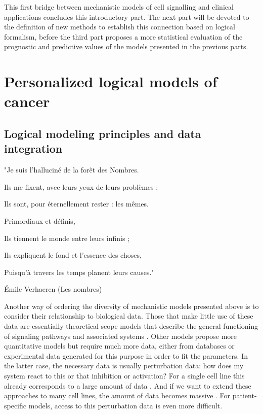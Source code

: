 \documentclass[a4paper,12pt,twoside,onecolumn,openright,final,oldfontcommands]{memoir}
\newcommand{\initial}[1]{
	\lettrine[lines=3,lhang=0.33,nindent=0em]{
		\color{gray}
     		{\textsc{#1}}}{}}
\begin{document}
This first bridge between mechanistic models of cell signalling and
clinical applications concludes this introductory part. The next part
will be devoted to the definition of new methods to establish this
connection based on logical formalism, before the third part proposes a
more statistical evaluation of the prognostic and predictive values of
the models presented in the previous parts.

\part{Personalized logical models of
cancer}\label{part-personalized-logical-models-of-cancer}

\chapter{Logical modeling principles and data
integration}\label{logical-modeling-principles-and-data-integration}

\epigraph{"Je suis l’halluciné de la forêt des Nombres.

Ils me fixent, avec leurs yeux de leurs problèmes ;

Ils sont, pour éternellement rester : les mêmes.

Primordiaux et définis,

Ils tiennent le monde entre leurs infinis ;

Ils expliquent le fond et l’essence des choses,

Puisqu’à travers les temps planent leurs causes."}{Émile Verhaeren (Les nombres)}

\initial{A}nother way of ordering the diversity of mechanistic models
presented above is to consider their relationship to biological data.
Those that make little use of these data are essentially theoretical
scope models that describe the general functioning of signaling pathways
and associated systems \citep{calzone2010mathematical}. Other models
propose more quantitative models but require much more data, either from
databases or experimental data generated for this purpose in order to
fit the parameters. In the latter case, the necessary data is usually
perturbation data: how does my system react to this or that inhibition
or activation? For a single cell line this already corresponds to a
large amount of data \citep{razzaq2018computational}. And if we want to
extend these approaches to many cell lines, the amount of data becomes
massive \citep{frohlich2018efficient}. For patient-specific models,
access to this perturbation data is even more difficult.
\end{document}
